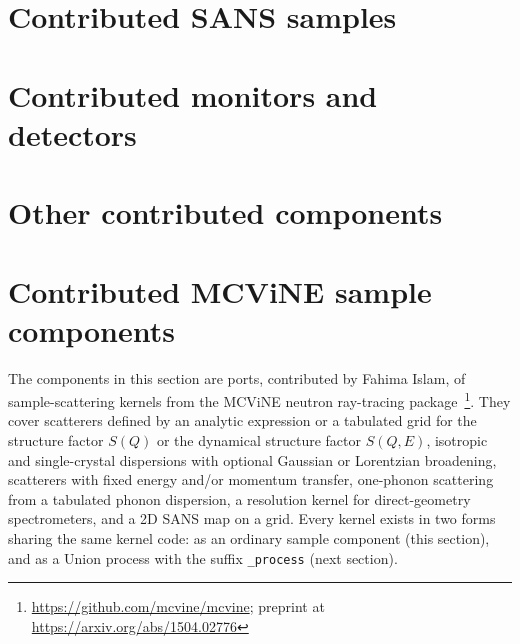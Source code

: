 \section{Contributed SANS samples}





















\section{Contributed monitors and detectors}













\section{Other contributed components}


\section{Contributed MCViNE sample components}
\label{s:contrib-mcvine}

The components in this section are \MCS ports, contributed by Fahima Islam, of
sample-scattering kernels from the MCViNE neutron ray-tracing
package~\cite{mcvine}\footnote{\url{https://github.com/mcvine/mcvine}; preprint at \url{https://arxiv.org/abs/1504.02776}}.
They cover scatterers defined by an analytic expression or a tabulated grid for
the structure factor $S(Q)$ or the dynamical structure factor $S(Q,E)$,
isotropic and single-crystal dispersions with optional Gaussian or Lorentzian
broadening, scatterers with fixed energy and/or momentum transfer, one-phonon
scattering from a tabulated phonon dispersion, a resolution kernel for
direct-geometry spectrometers, and a 2D SANS map on a grid. Every kernel exists
in two forms sharing the same kernel code: as an ordinary sample component
(this section), and as a Union process with the suffix \texttt{\_process}
(next section).

